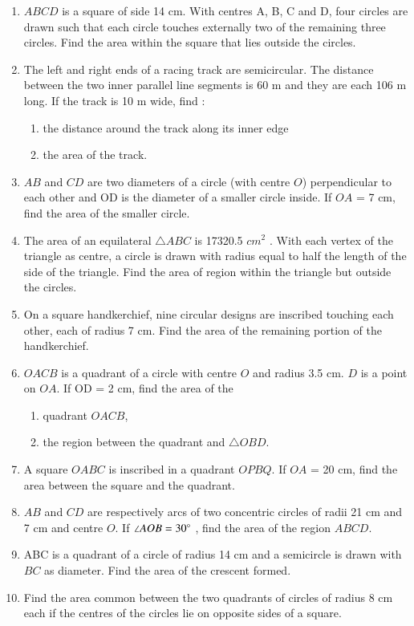 \begin{enumerate}[label=\arabic*.,ref=\thesubsection.\theenumi]
%
\item $ABCD$ is a square of side 14 cm. With centres A, B, C and D, four circles are drawn such that each circle touches externally two of the remaining three circles. Find the area within the square that lies outside the circles.
\item The left and right ends of a racing track are semicircular.
The distance between the two inner parallel line segments is 60 m and they are each 106 m long. If the track is 10 m wide, find : 
\begin{enumerate}
\item the distance around the track along its inner edge 
\item the area of the track.
\end{enumerate}
\item $AB$ and $CD$ are two diameters of a circle (with centre $O$) perpendicular to each other and OD is the diameter of a  smaller circle inside. If $OA$ = 7 cm, find the area of the smaller circle.
\item The area of an equilateral $\triangle ABC$ is 17320.5 $cm^2$
. With each vertex of the triangle as centre, a circle is drawn with radius equal to half the length of the side of the triangle. Find the area of region within the triangle but outside the circles. 
\item On a square handkerchief, nine circular designs are inscribed touching each other, each of radius 7 cm. Find the area of the remaining portion of the handkerchief.
\item $OACB$ is a quadrant of a circle with centre $O$ and radius 3.5 cm. $D$ is a point on $OA$.  If OD = 2 cm, find the area of the
\begin{enumerate}
\item quadrant $OACB$,
 \item the region between the quadrant and $\triangle OBD$.
\end{enumerate}
\item A square $OABC$ is inscribed in a quadrant $OPBQ$. If $OA$ = 20 cm, find the area between the square and the quadrant.
\item $AB$ and $CD$ are respectively arcs of two concentric circles of radii 21 cm and 7 cm and centre $O$.  If  $\angle  AOB = 30 \degree$ , find the area of the region $ABCD$.
\item ABC is a quadrant of a circle of radius 14 cm and a semicircle is drawn with $BC$ as diameter. Find the area of the crescent formed.
\item Find the area common between the two quadrants of circles of radius 8 cm each if the centres of the circles lie on opposite sides of a square.

\end{enumerate}
